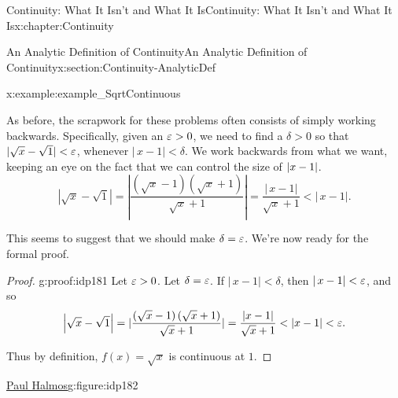 \begin{chapterptx}{Continuity: What It Isn't and What It Is}{}{Continuity: What It Isn't and What It Is}{}{}{x:chapter:Continuity}
\begin{sectionptx}{An Analytic Definition of Continuity}{}{An Analytic Definition of Continuity}{}{}{x:section:Continuity-AnalyticDef}
\begin{example}{}{x:example:example_SqrtContinuous}
			\par
			As before, the scrapwork for these problems often consists of simply working backwards.  Specifically, given an \(\varepsilon>0\), we need to find a \(\delta>0\) so that \(|\sqrt{x}-\sqrt{1}|< \varepsilon\), whenever \(|\,x-1|\lt
			\delta\).  We work backwards from what we want, keeping an eye on the fact that we can control the size of \(\left|x-1\right|\).%
			\begin{equation*}
				|\sqrt{x}-\sqrt{1}|=|\frac{\left(\sqrt{x}-1\right)\left(\sqrt{x}+1\right)}{\sqrt{x}+1}|=\frac{|\,x-1|}{\sqrt{x}+1}\lt |\,x-1|\text{.}
			\end{equation*}
			\par
			This seems to suggest that we should make \(\delta=\varepsilon\). We're now ready for the formal proof.%
		\end{example}
		\begin{proof}{}{g:proof:idp181}
			Let \(\varepsilon>0\). Let \(\delta=\varepsilon\). If \(|\,x-1|\lt \delta\), then \(|\,x-1|< \varepsilon\), and so%
			\begin{equation*}
				\left|\sqrt{x}-\sqrt{1}\right|=|\frac{\left(\sqrt{x}-1\right)\left(\sqrt{x}+1\right)}{ \sqrt{x}+1}|=\frac{|x-1|}{\sqrt{x}+1}< \left|x-1\right|< \varepsilon\text{.}
			\end{equation*}
			\par
			Thus by definition, \(f(x)=\sqrt{x}\) is continuous at \(1\).%
		\end{proof}
		\begin{figureptx}{\href{https://mathshistory.st-andrews.ac.uk/Biographies/Halmos/}{Paul Halmos}\protect\footnotemark{}}{g:figure:idp182}{}%
			\begin{image}{0.325}{0.35}{0.325}%

\end{image}
\end{figureptx}
\end{sectionptx}
\end{chapterptx}
